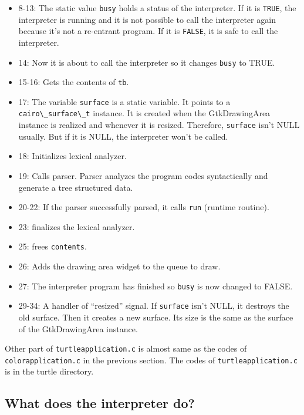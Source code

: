 \begin{itemize}
\tightlist
\item
  8-13: The static value \passthrough{\lstinline!busy!} holds a status
  of the interpreter. If it is \passthrough{\lstinline!TRUE!}, the
  interpreter is running and it is not possible to call the interpreter
  again because it's not a re-entrant program. If it is
  \passthrough{\lstinline!FALSE!}, it is safe to call the interpreter.
\item
  14: Now it is about to call the interpreter so it changes
  \passthrough{\lstinline!busy!} to TRUE.
\item
  15-16: Gets the contents of \passthrough{\lstinline!tb!}.
\item
  17: The variable \passthrough{\lstinline!surface!} is a static
  variable. It points to a \passthrough{\lstinline!cairo\_surface\_t!}
  instance. It is created when the GtkDrawingArea instance is realized
  and whenever it is resized. Therefore,
  \passthrough{\lstinline!surface!} isn't NULL usually. But if it is
  NULL, the interpreter won't be called.
\item
  18: Initializes lexical analyzer.
\item
  19: Calls parser. Parser analyzes the program codes syntactically and
  generate a tree structured data.
\item
  20-22: If the parser successfully parsed, it calls
  \passthrough{\lstinline!run!} (runtime routine).
\item
  23: finalizes the lexical analyzer.
\item
  25: frees \passthrough{\lstinline!contents!}.
\item
  26: Adds the drawing area widget to the queue to draw.
\item
  27: The interpreter program has finished so
  \passthrough{\lstinline!busy!} is now changed to FALSE.
\item
  29-34: A handler of ``resized'' signal. If
  \passthrough{\lstinline!surface!} isn't NULL, it destroys the old
  surface. Then it creates a new surface. Its size is the same as the
  surface of the GtkDrawingArea instance.
\end{itemize}

Other part of \passthrough{\lstinline!turtleapplication.c!} is almost
same as the codes of \passthrough{\lstinline!colorapplication.c!} in the
previous section. The codes of
\passthrough{\lstinline!turtleapplication.c!} is in the turtle
directory.

\hypertarget{what-does-the-interpreter-do}{%
\subsection{What does the interpreter
do?}\label{what-does-the-interpreter-do}}

